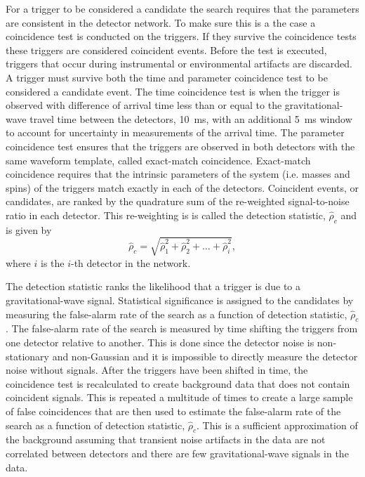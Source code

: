 For a trigger to be considered a candidate the search requires that the parameters are consistent in the detector network. To make sure this is a the case a coincidence test is conducted on the triggers. If they survive the coincidence tests these triggers are considered coincident events. Before the test is executed, triggers that occur during instrumental or environmental artifacts are discarded. A trigger must survive both the time and parameter coincidence test to be considered a candidate event. The time coincidence test is when the trigger is observed with difference of arrival time less than or equal to the gravitational-wave travel time between the detectors, 10~ms, with an additional 5~ms window to account for uncertainty in measurements of the arrival time. The parameter coincidence test ensures that the triggers are observed in both detectors with the same waveform template, called exact-match coincidence. Exact-match coincidence requires that the intrinsic parameters of the system (i.e. masses and spins) of the triggers match exactly in each of the detectors. Coincident events, or candidates, are ranked by the quadrature sum of the re-weighted signal-to-noise ratio in each detector. This re-weighting is is called the detection statistic, $\hat{\rho}_c$ and is given by
\begin{equation}
    \hat{\rho}_c = \sqrt{\hat{\rho}_1^2+\hat{\rho}_2^2+\ldots+\hat{\rho}_i^2},
\end{equation}
where $i$ is the $i$-th detector in the network. 

The detection statistic ranks the likelihood that a trigger is due to a gravitational-wave signal. Statistical significance is assigned to the candidates by measuring the false-alarm rate of the search as a function of detection statistic, $\hat{\rho}_c$. The false-alarm rate of the search is measured by time shifting the triggers from one detector relative to another. This is done since the detector noise is non-stationary and non-Gaussian and it is impossible to directly measure the detector noise without signals. After the triggers have been shifted in time, the coincidence test is recalculated to create background data that does not contain coincident signals. This is repeated a multitude of times to create a large sample of false coincidences that are then used to estimate the false-alarm rate of the search as a function of detection statistic, $\hat{\rho}_c$. This is a sufficient approximation of the background assuming that transient noise artifacts in the data are not correlated between detectors and there are few gravitational-wave signals in the data.

